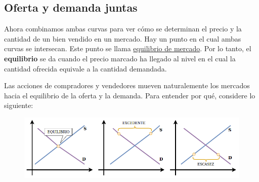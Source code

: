 \newpage

\subsection{Oferta y demanda juntas}
Ahora combinamos ambas curvas para ver cómo se determinan el precio y la cantidad de un bien vendido en un mercado.
Hay un punto en el cual ambas curvas se intersecan. Este punto se llama \underline{equilibrio de mercado}.
Por lo tanto, el \textbf{equilibrio} se da cuando el precio marcado ha llegado al nivel en el cual la cantidad ofrecida equivale a la cantidad demandada.

\par Las acciones de compradores y vendedores mueven naturalemente los mercados hacia el equilibrio de la oferta y la demanda. Para entender por qué, considere lo siguiente:


\begin{figure}[hbt!]
    \centering
    \includegraphics[scale=0.6]{images/char4.png}
\end{figure}